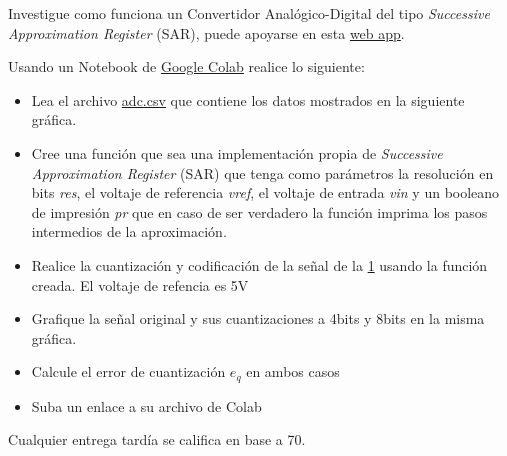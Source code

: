 \documentclass[12pt]{article}
\begin{document}
\setlength{\parindent}{0em}

Investigue como funciona un Convertidor Analógico-Digital del tipo \emph{Successive Approximation Register} (SAR), puede apoyarse en esta \href{https://adc-dashboard.streamlit.app/}{web app}.


Usando un Notebook de \href{https://colab.research.google.com/}{Google Colab} realice lo siguiente:

\begin{itemize}
    \item Lea el archivo \href{https://estudianteccr-my.sharepoint.com/:u:/g/personal/prof_juan_rojas_estudiantec_cr/EcuXJs2cG21HnH02L5fq5OMBOoznw5P7fMkWscsfJdJjgQ?e=8s1NAe}{adc.csv} que contiene los datos mostrados en la siguiente gráfica.
    \begin{figure}[H]
        \centering
        \caption{}
        \label{fig:signal}
    \end{figure}
    \item Cree una función que sea una implementación propia de \emph{Successive Approximation Register} (SAR) que tenga como parámetros la resolución en bits \emph{res}, el voltaje de referencia \emph{vref}, el voltaje de entrada \emph{vin} y un booleano de impresión \emph{pr} que en caso de ser verdadero la función imprima los pasos intermedios de la aproximación.
    \item Realice la cuantización y codificación de la señal de la \ref{fig:signal} usando la función creada. El voltaje de refencia es 5\si{V}
    \item Grafique la señal original y sus cuantizaciones a 4bits y 8bits en la misma gráfica.
    \item Calcule el error de cuantización $e_q$ en ambos casos
    \item Suba un enlace a su archivo de Colab
\end{itemize}

Cualquier entrega tardía se califica en base a 70. 

% 
% 
\end{document}
